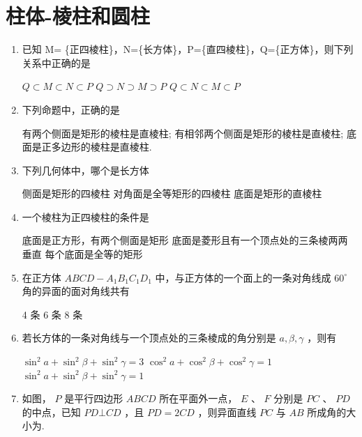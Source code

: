 \section*{柱体-棱柱和圆柱}

\begin{enumerate}

\item 已知 M= \{正四棱柱\}，N=\{长方体\}，P=\{直四棱柱\}，Q=\{正方体\}，则下列关系中正确的是 

{${Q} \subset  {M} \subset  {N} \subset  {P}$}
{${Q} \supset  {N} \supset  {M} \supset  {P}$} 
{${Q} \subset  {N} \subset  {M} \subset  {P}$}

\item 下列命题中，正确的是

{有两个侧面是矩形的棱柱是直棱柱;}
{有相邻两个侧面是矩形的棱柱是直棱柱;}
{底面是正多边形的棱柱是直棱柱.}

\item 下列几何体中，哪个是长方体 

{侧面是矩形的四棱柱}
{对角面是全等矩形的四棱柱}
{底面是矩形的直棱柱}

\item 一个棱柱为正四棱柱的条件是 

{底面是正方形，有两个侧面是矩形}
{底面是菱形且有一个顶点处的三条棱两两垂直} 
{每个底面是全等的矩形}

\item 在正方体 ${{ABCD}} - {{A}}_{1}{{B}}_{1}{{C}}_{1}{{D}}_{1}$ 中，与正方体的一个面上的一条对角线成 ${60}^{ \circ  }$ 角的异面的面对角线共有 

{4 条} 
{6 条} 
{8 条}

\item 若长方体的一条对角线与一个顶点处的三条棱成的角分别是 $a,\beta ,\gamma$ ，则有 

{${\sin }^{2}a + {\sin }^{2}\beta  + {\sin }^{2}\gamma  = 3$}
{${\cos }^{2}a + {\cos }^{2}\beta  + {\cos }^{2}\gamma  = 1$}
{${\sin }^{2}a + {\sin }^{2}\beta  + {\sin }^{2}\gamma  = 1$}

\item 如图， $P$ 是平行四边形 ${ABCD}$ 所在平面外一点， $E$ 、 $F$ 分别是 ${PC}$ 、 ${PD}$ 的中点，已知 ${PD}\bot {CD}$ ，且 ${PD} = {2CD}$ ，则异面直线 ${PC}$ 与 ${AB}$ 所成角的大小为.


\end{enumerate}
